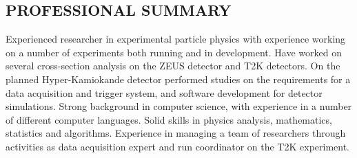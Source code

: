 \documentclass[margin]{res}
\begin{document}
 
\begin{resume} 

\section{PROFESSIONAL SUMMARY}
Experienced researcher in experimental particle physics with experience working on a number of experiments both running and in development.  Have worked on several cross-section analysis on the ZEUS detector and T2K detectors.  On the planned Hyper-Kamiokande detector performed studies on the requirements for a data acquisition and trigger system, and software development for detector simulations.  Strong background in computer science, with experience in a number of different computer languages.  Solid skills in physics analysis, mathematics, statistics and algorithms.  Experience in managing a team of researchers through activities as data acquisition expert and run coordinator on the T2K experiment.  


\end{resume}
\end{document}
